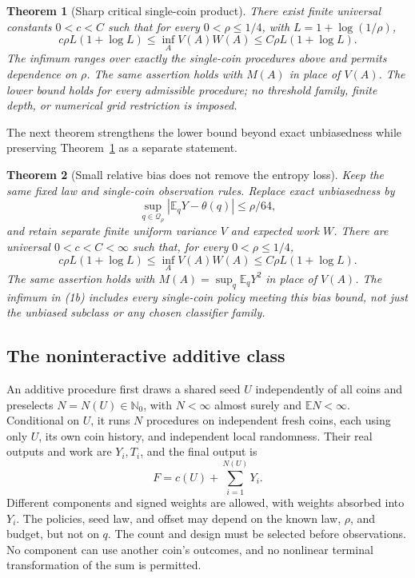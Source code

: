 \documentclass[11pt]{article}
\newtheorem{theorem}{Theorem}
\newcommand{\E}{\mathbb E}
\begin{document}
\begin{theorem}[Sharp critical single-coin product]\label{thm:main}
There exist finite universal constants $0<c<C$ such that for every
$0<\rho\le1/4$, with $L=1+\log(1/\rho)$,
\[
 c\rho L(1+\log L)
 \le \inf_A V(A)W(A)
 \le C\rho L(1+\log L).                                  \tag{1}
\]
The infimum ranges over exactly the single-coin procedures above and permits
dependence on $\rho$. The same assertion holds with $M(A)$ in place of $V(A)$.
The lower bound holds for every admissible procedure; no threshold family,
finite depth, or numerical grid restriction is imposed.
\end{theorem}

The next theorem strengthens the lower bound beyond exact unbiasedness while
preserving Theorem~\ref{thm:main} as a separate statement.

\begin{theorem}[Small relative bias does not remove the entropy loss]\label{thm:bias}
Keep the same fixed law and single-coin observation rules. Replace exact
unbiasedness by
\[
 \sup_{q\in\mathcal Q_\rho}|\E_qY-\theta(q)|\le\rho/64,
\]
and retain separate finite uniform variance $V$ and expected work $W$.
There are universal $0<c<C<\infty$ such that, for every $0<\rho\le1/4$,
\[
 c\rho L(1+\log L)
 \le\inf_A V(A)W(A)
 \le C\rho L(1+\log L).                                 \tag{1b}
\]
The same assertion holds with $M(A)=\sup_q\E_qY^2$ in place of $V(A)$.
The infimum in (1b) includes every single-coin policy meeting this bias bound,
not just the unbiased subclass or any chosen classifier family.
\end{theorem}

\subsection*{The noninteractive additive class}
An additive procedure first draws a shared seed $U$ independently of all
coins and preselects $N=N(U)\in\mathbb N_0$, with $N<\infty$ almost surely
and $\E N<\infty$. Conditional on $U$, it runs $N$ procedures on independent
fresh coins, each using only $U$, its own coin history, and independent local
randomness. Their real outputs and work are $Y_i,T_i$, and the final output is
\[
 F=c(U)+\sum_{i=1}^{N(U)}Y_i.
\]
Different components and signed weights are allowed, with weights absorbed
into $Y_i$. The policies, seed law, and offset may depend on the known law,
$\rho$, and budget, but not on $q$. The count and design must be selected
before observations. No component can use another coin's outcomes, and no
nonlinear terminal transformation of the sum is permitted.
\end{document}

